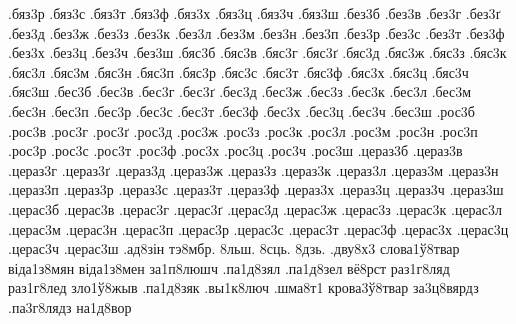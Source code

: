 {.бяз3р
.бяз3с
.бяз3т
.бяз3ф
.бяз3х
.бяз3ц
.бяз3ч
.бяз3ш
.без3б
.без3в
.без3г
.без3ґ
.без3д
.без3ж
.без3з
.без3к
.без3л
.без3м
.без3н
.без3п
.без3р
.без3с
.без3т
.без3ф
.без3х
.без3ц
.без3ч
.без3ш
.бяс3б
.бяс3в
.бяс3г
.бяс3ґ
.бяс3д
.бяс3ж
.бяс3з
.бяс3к
.бяс3л
.бяс3м
.бяс3н
.бяс3п
.бяс3р
.бяс3с
.бяс3т
.бяс3ф
.бяс3х
.бяс3ц
.бяс3ч
.бяс3ш
.бес3б
.бес3в
.бес3г
.бес3ґ
.бес3д
.бес3ж
.бес3з
.бес3к
.бес3л
.бес3м
.бес3н
.бес3п
.бес3р
.бес3с
.бес3т
.бес3ф
.бес3х
.бес3ц
.бес3ч
.бес3ш
.рос3б
.рос3в
.рос3г
.рос3ґ
.рос3д
.рос3ж
.рос3з
.рос3к
.рос3л
.рос3м
.рос3н
.рос3п
.рос3р
.рос3с
.рос3т
.рос3ф
.рос3х
.рос3ц
.рос3ч
.рос3ш
.цераз3б
.цераз3в
.цераз3г
.цераз3ґ
.цераз3д
.цераз3ж
.цераз3з
.цераз3к
.цераз3л
.цераз3м
.цераз3н
.цераз3п
.цераз3р
.цераз3с
.цераз3т
.цераз3ф
.цераз3х
.цераз3ц
.цераз3ч
.цераз3ш
.церас3б
.церас3в
.церас3г
.церас3ґ
.церас3д
.церас3ж
.церас3з
.церас3к
.церас3л
.церас3м
.церас3н
.церас3п
.церас3р
.церас3с
.церас3т
.церас3ф
.церас3х
.церас3ц
.церас3ч
.церас3ш
.ад8зін
тэ8мбр.
8льш.
8сць.
8дзь.
.дву8х3
слова1ў8твар
віда1з8мян
віда1з8мен
за1п8люшч
.па1д8зял
.па1д8зел
вё8рст
раз1г8ляд
раз1г8лед
зло1ў8жыв
.па1д8зяк
.вы1к8люч
.шма8т1
крова3ў8твар
за3ц8вярдз
.па3г8лядз
на1д8вор
}

